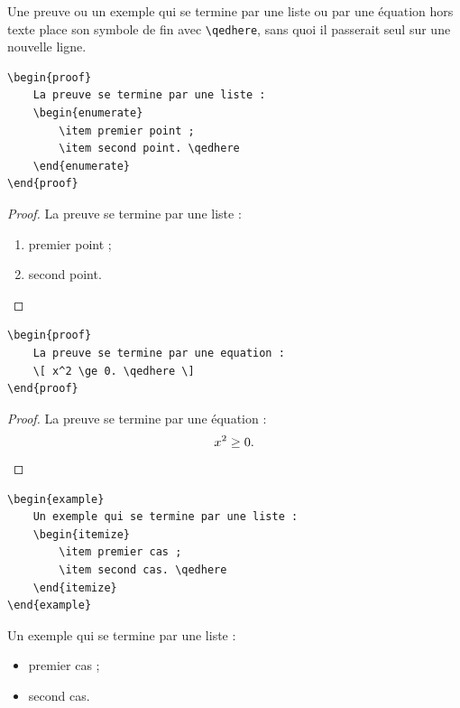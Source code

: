 Une preuve ou un exemple qui se termine par une liste ou par une équation hors
texte place son symbole de fin avec \verb|\qedhere|, sans quoi il passerait
seul sur une nouvelle ligne.

\begin{lstlisting}
\begin{proof}
    La preuve se termine par une liste :
    \begin{enumerate}
        \item premier point ;
        \item second point. \qedhere
    \end{enumerate}
\end{proof}
\end{lstlisting}
\begin{proof}
    La preuve se termine par une liste :
    \begin{enumerate}
        \item premier point ;
        \item second point. \qedhere
    \end{enumerate}
\end{proof}

\begin{lstlisting}
\begin{proof}
    La preuve se termine par une equation :
    \[ x^2 \ge 0. \qedhere \]
\end{proof}
\end{lstlisting}
\begin{proof}
    La preuve se termine par une équation :
    \[ x^2 \ge 0. \qedhere \]
\end{proof}

\begin{lstlisting}
\begin{example}
    Un exemple qui se termine par une liste :
    \begin{itemize}
        \item premier cas ;
        \item second cas. \qedhere
    \end{itemize}
\end{example}
\end{lstlisting}
\begin{example}
    Un exemple qui se termine par une liste :
    \begin{itemize}
        \item premier cas ;
        \item second cas. \qedhere
    \end{itemize}
\end{example}


